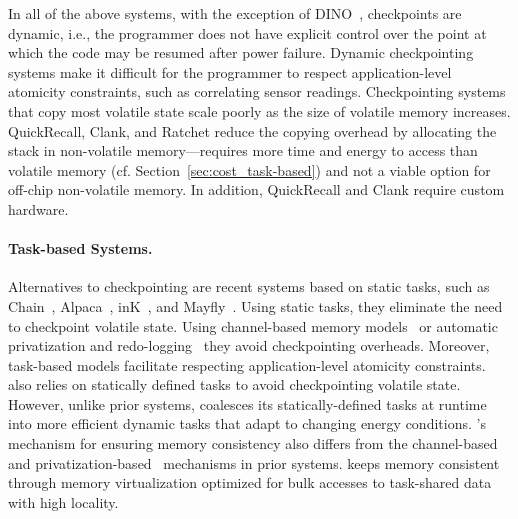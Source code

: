 In all of the above systems, with the exception of DINO~\cite{dino}, checkpoints are dynamic, i.e., the programmer does not have explicit control over the point at which the code may be resumed after power failure. Dynamic checkpointing systems make it difficult for the programmer to respect application-level atomicity constraints, such as correlating sensor readings. Checkpointing systems that copy most volatile state scale poorly as the size of volatile memory increases.  QuickRecall, Clank, and Ratchet reduce the copying overhead by allocating the stack in non-volatile memory---requires more time and energy to access than volatile memory (cf. Section~\ref{sec:cost_task-based}) and not a viable option for off-chip non-volatile memory. In addition, QuickRecall and Clank require custom hardware. 

\paragraph{Task-based Systems.}
Alternatives to checkpointing are recent systems based on static tasks, such as Chain~\cite{chain}, Alpaca~\cite{alpaca}, inK~\cite{yildirim2018ink}, and Mayfly~\cite{hester_sensys_2017}. Using static tasks, they eliminate the need to checkpoint volatile state. Using channel-based memory models~\cite{chain,hester_sensys_2017} or automatic privatization and redo-logging~\cite{alpaca} they avoid checkpointing overheads. Moreover, task-based models facilitate respecting application-level atomicity constraints. \sys also relies on
statically defined tasks to avoid checkpointing volatile state. However, unlike prior systems, \sys coalesces its statically-defined tasks at runtime into more efficient dynamic tasks that adapt to changing energy conditions. \sys's mechanism for ensuring memory consistency also differs from the channel-based~\cite{chain} and privatization-based~\cite{alpaca} mechanisms in prior systems. \sys keeps memory consistent through memory virtualization optimized for bulk accesses to task-shared data with high locality.

